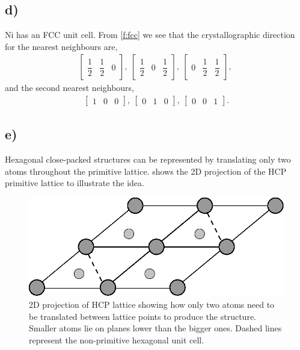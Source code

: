 \documentclass[a4paper]{article}
\begin{document}
	\subsection{d)}
	Ni has an FCC unit cell. From \cref{f:fcc} we see that the crystallographic direction for the nearest neighbours are,
	\begin{align}
		\begin{bmatrix}
		\dfrac{1}{2} & \dfrac{1}{2} & 0
		\end{bmatrix},~
		\begin{bmatrix}
		\dfrac{1}{2} & 0 & \dfrac{1}{2}
		\end{bmatrix},~
		\begin{bmatrix}
		0 & \dfrac{1}{2} & \dfrac{1}{2}
		\end{bmatrix},~
	\end{align}
	and the second nearest neighbours,
	\begin{align}
		\begin{bmatrix}
		1 & 0 & 0
		\end{bmatrix},~
		\begin{bmatrix}
		0 & 1 & 0
		\end{bmatrix},~
		\begin{bmatrix}
		0 & 0 & 1
		\end{bmatrix}.
	\end{align}
	\subsection{e)}
	Hexagonal close-packed structures can be represented by translating only two atoms throughout the primitive lattice.  shows the 2D projection of the HCP primitive lattice to illustrate the idea.
	\begin{figure}
		\centering
		\includegraphics[width=0.33\linewidth]{hcp2d.eps}
		\caption{2D projection of HCP lattice showing how only two atoms need to be translated between lattice points to produce the structure. Smaller atoms lie on planes lower than the bigger ones. Dashed lines represent the non-primitive hexagonal unit cell.}
		\label{f:hcp2d}
	\end{figure}
	
\end{document}
